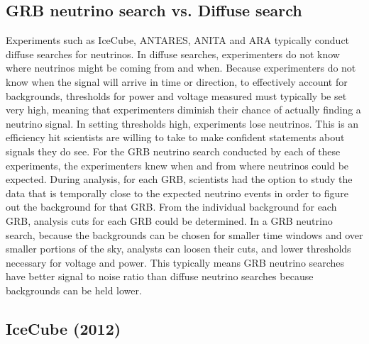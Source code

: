\documentclass[12pt]{article}
\begin{document}
\begin{doublespace}
\subsection{GRB neutrino search vs. Diffuse search}
Experiments such as IceCube, ANTARES, ANITA and ARA typically conduct diffuse searches for neutrinos. In diffuse searches, experimenters do not know where neutrinos might be coming from and when. Because experimenters do not know when the signal will arrive in time or direction, to effectively account for backgrounds, thresholds for power and voltage measured must typically be set very high, meaning that experimenters diminish their chance of actually finding a neutrino signal. In setting thresholds high, experiments lose neutrinos. This is an efficiency hit scientists are willing to take to make confident statements about signals they do see. For the GRB neutrino search conducted by each of these experiments, the experimenters knew when and from where neutrinos could be expected. During analysis, for each GRB, scientists had the option to study the data that is temporally close to the expected neutrino events in order to figure out the background for that GRB. From the individual background for each GRB, analysis cuts for each GRB could be determined. In a GRB neutrino search, because the backgrounds can be chosen for smaller time windows and over smaller portions of the sky, analysts can loosen their cuts, and lower thresholds necessary for voltage and power. This typically means GRB neutrino searches have better signal to noise ratio than diffuse neutrino searches because backgrounds can be held lower. 

\subsection{IceCube (2012)}


\end{doublespace}
\end{document}
